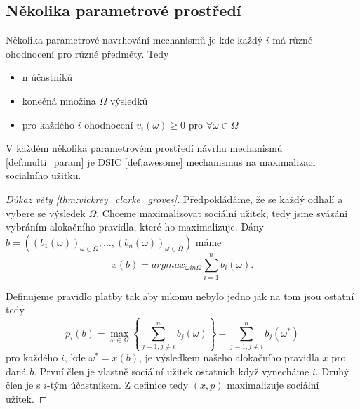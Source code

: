 \subsection{Několika parametrové prostředí}
\begin{definition}
    \label{def:multi_param}
    Několika parametrové navrhování mechanismů je kde každý $i$ má různé ohodnocení pro různé předměty. 
    Tedy 
    \begin{itemize}
        \item n účastníků
        \item konečná množina $\Omega$ výsledků
        \item pro každého $i$ ohodnocení $v_i(\omega) \geq 0$ pro $\forall \omega \in \Omega$
    \end{itemize}
\end{definition}

\begin{theorem}
    \label{thm:vickrey_clarke_groves}
    V každém několika parametrovém prostředí návrhu mechanismů \ref{def:multi_param} je DSIC \ref{def:awesome} mechanismus na maximalizaci socialního užitku. 
\end{theorem} 
\begin{proof}[Důkaz věty \ref{thm:vickrey_clarke_groves}]
   Předpokládáme, že se každý odhalí a vybere se výsledek $\Omega$. 
   Chceme maximalizovat sociální užitek, tedy jsme svázáni vybráním alokačního pravidla, které ho maximalizuje. 
   Dány $b = ((b_1(\omega))_{\omega \in \Omega},\dots,(b_n(\omega))_{\omega \in \Omega})$ máme 
   \[
       x(b) = argmax_{\omega in \Omega}\sum^n_{i=1} b_i(\omega). 
   \]

   Definujeme pravidlo platby tak aby nikomu nebylo jedno jak na tom jsou ostatní tedy 
   \[
   p_i(b) = \max_{\omega \in \Omega} \left\{ \sum^n_{j=1, j\neq i} b_j(\omega) \right\} - \sum^n_{j=1, j\neq i} b_j(\omega^*)
   \]
   pro každého $i$, kde $\omega^* = x(b)$, je výsledkem našeho alokačního pravidla $x$ pro daná $b$. 
   První člen je vlastně sociální užitek ostatních když vynecháme $i$. 
   Druhý člen je s $i$-tým účastníkem. 
   Z definice tedy $(x,p)$ maximalizuje sociální užitek. 

\end{proof}
